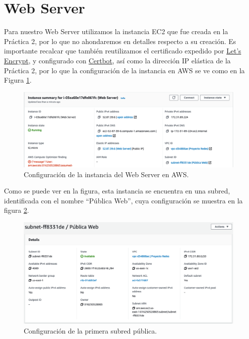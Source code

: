 \documentclass{article}
\begin{document}
\newpage
\section{Web Server}

Para nuestro Web Server utilizamos la instancia EC2 que
fue creada en la Pr\'actica 2, por lo que no ahondaremos
en detalles respecto a su creaci\'on.   Es importante
recalcar que tambi\'en reutilizamos el certificado
expedido por \href{https://letsencrypt.org/}{Let's Encrypt},
y configurado con \href{https://certbot.eff.org/}{Certbot},
as\'i como la direcci\'on IP el\'astica de la Pr\'actica 2,
por lo que la configuraci\'on de la instancia en AWS se ve
como en la Figura \ref{fig:web-instancia}.

\begin{figure}[H]
  \centering
  \includegraphics[width=\textwidth]{web/instancia}
  \caption{Configuraci\'on de la instancia del Web Server
           en AWS.}
  \label{fig:web-instancia}
\end{figure}

Como se puede ver en la figura, esta instancia se
encuentra en una subred, identificada con el nombre
``P\'ublica Web'', cuya configuraci\'on se muestra
en la figura \ref{fig:web-subred}.

\begin{figure}[H]
  \centering
  \includegraphics[width=\textwidth]{web/subred}
  \caption{Configuraci\'on de la primera subred p\'ublica.}
  \label{fig:web-subred}
\end{figure}
\end{document}
